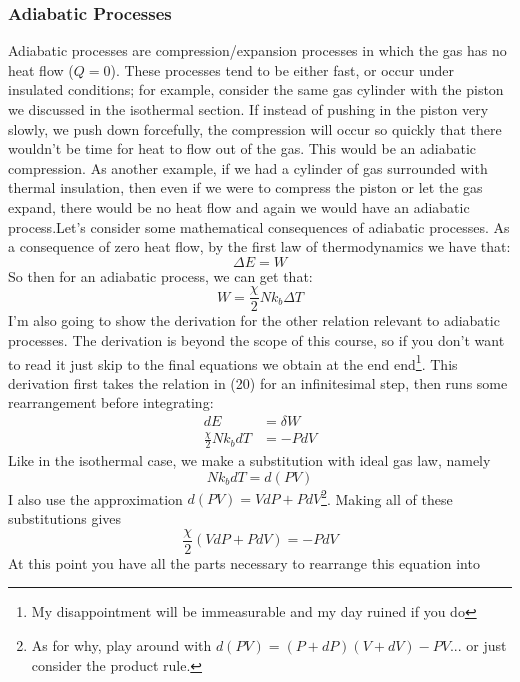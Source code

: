 \subsubsection{Adiabatic Processes}
Adiabatic processes are compression/expansion processes in which the gas has no heat flow ($Q=0$). These processes tend to be either fast, or occur under insulated conditions; for example, consider the same gas cylinder with the piston we discussed in the isothermal section. If instead of pushing in the piston very slowly, we push down forcefully, the compression will occur so quickly that there wouldn't be time for heat to flow out of the gas. This would be an adiabatic compression. As another example, if we had a cylinder of gas surrounded with thermal insulation, then even if we were to compress the piston or let the gas expand, there would be no heat flow and again we would have an adiabatic process.Let's consider some mathematical consequences of adiabatic processes. As a consequence of zero heat flow, by the first law of thermodynamics we have that:
\begin{equation}
    \Delta E = W
\end{equation}
So then for an adiabatic process, we can get that:
\begin{equation}
    W = \frac{\chi}{2}N{k_b}\Delta T
\end{equation}
I'm also going to show the derivation for the other relation relevant to adiabatic processes. The derivation is beyond the scope of this course, so if you don't want to read it just skip to the final equations we obtain at the end end\footnote{My disappointment will be immeasurable and my day ruined if you do}. This derivation first takes the relation in (20) for an infinitesimal step, then runs some rearrangement before integrating:
\begin{align*}
    dE &= \delta W \\
    \frac{\chi}{2}N{k_b}dT &= -PdV
\end{align*}
Like in the isothermal case, we make a substitution with ideal gas law, namely
\begin{equation*}
    N{k_b}dT = d(PV)
\end{equation*}
I also use the approximation $d(PV) = VdP + PdV$\footnote{As for why, play around with $d(PV) = (P+dP)(V+dV) - PV$... or just consider the product rule.}. Making all of these substitutions gives
\begin{equation*}
    \frac{\chi}{2}(VdP + PdV) = -PdV
\end{equation*}
At this point you have all the parts necessary to rearrange this equation into
